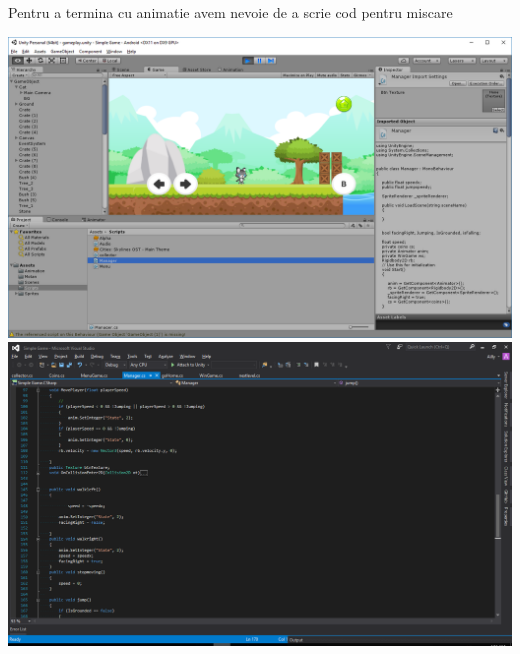 Pentru a termina cu animatie avem nevoie de a scrie cod pentru miscare  
\begin{center}
\includegraphics[scale=0.5]{images/5}\\
\includegraphics[scale=0.5]{images/6}\\
\end{center}
\clearpage